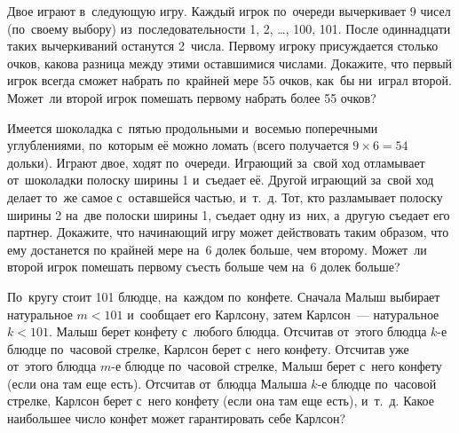 \begin{problems}

\item
Двое играют в~следующую игру.
Каждый игрок по~очереди вычеркивает 9 чисел (по~своему выбору)
из~последовательности 1, 2, \ldots, 100, 101.
После одиннадцати таких вычеркиваний останутся 2~числа.
Первому игроку присуждается столько очков, какова разница между этими
оставшимися числами.
Докажите, что первый игрок всегда сможет набрать по~крайней мере 55 очков,
как~бы ни~играл второй.
Может~ли второй игрок помешать первому набрать более 55 очков?

\item
Имеется шоколадка с~пятью продольными и~восемью поперечными углублениями,
по~которым её можно ломать (всего получается $9 \times 6 = 54$ дольки).
Играют двое, ходят по~очереди.
Играющий за~свой ход отламывает от~шоколадки полоску ширины 1 и~съедает её.
Другой играющий за~свой ход делает то~же самое с~оставшейся частью, и~т.~д.
Тот, кто разламывает полоску ширины 2 на~две полоски ширины 1, съедает одну
из~них, а~другую съедает его партнер.
Докажите, что начинающий игру может действовать таким образом, что ему
достанется по крайней мере на~6 долек больше, чем второму.
Может~ли второй игрок помешать первому съесть больше чем на~6 долек больше?

\item
По~кругу стоит 101 блюдце, на~каждом по~конфете.
Сначала Малыш выбирает натуральное $m < 101$ и~сообщает его Карлсону, затем
Карлсон~--- натуральное $k < 101$.
Малыш берет конфету с~любого блюдца.
Отсчитав от~этого блюдца $k$-е блюдце по~часовой стрелке, Карлсон берет с~него
конфету.
Отсчитав уже от~этого блюдца $m$-е блюдце по~часовой стрелке, Малыш берет
с~него конфету (если она там еще есть).
Отсчитав от~блюдца Малыша $k$-е блюдце по~часовой стрелке, Карлсон берет с~него
конфету (если она там еще есть), и~т.~д.
Какое наибольшее число конфет может гарантировать себе Карлсон?

\end{problems}

